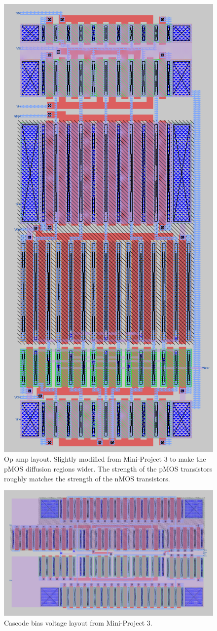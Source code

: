 \documentclass{article}
\begin{document}
\begin{figure}[H]
    \centering{}
    \includegraphics[width=0.5\columnwidth]{images/balanced_op_amp_layout.png}
    \caption{Op amp layout. Slightly modified from Mini-Project 3 to make the pMOS diffusion regions wider. The strength of the pMOS transistors roughly matches the strength of the nMOS transistors.}
    \label{fig:opamp_layout}
\end{figure}

\begin{figure}[H]
    \centering{}
    \includegraphics[width=0.7\columnwidth]{images/bias_layout_mp3.png}
    \caption{Cascode bias voltage layout from Mini-Project 3.}
    \label{fig:bias_layout}
\end{figure}
\end{document}
